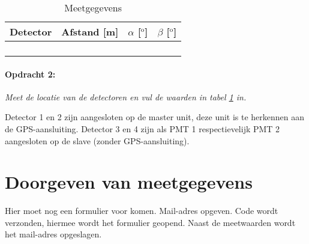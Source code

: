 \begin{table}[h]
    \centering
    \begin{tabular}{|>{\centering}p{3.5cm}|>{\centering}p{3.5cm}|>{\centering}p{3.5cm}|>{\centering}p{3.5cm}|}
        \hline 
        Detector & Afstand {[}m{]} & $\alpha$ {[}$^{\mathrm{o}}${]} & $\beta$ {[}$^{\mathrm{o}}${]}\tabularnewline
        \hline 
        \hline 
        1 &  &  & \tabularnewline
        \hline 
        2 &  &  & \tabularnewline
        \hline 
        3 &  &  & \tabularnewline
        \hline 
        4 &  &  & \tabularnewline
        \hline 
    \end{tabular}

\caption{\label{tab:Meetgegevens}Meetgegevens}
\end{table}

\paragraph{Opdracht 2:}

\textit{Meet de locatie van de detectoren en vul de waarden in tabel
\ref{tab:Meetgegevens} in.}

Detector 1 en 2 zijn aangesloten op de \hisparc master unit, deze unit is
te herkennen aan de GPS-aansluiting. Detector 3 en 4 zijn als PMT 1
respectievelijk PMT 2 aangesloten op de \hisparc slave (zonder
GPS-aansluiting).


\section{Doorgeven van meetgegevens}

Hier moet nog een formulier voor komen. Mail-adres opgeven. Code wordt
verzonden, hiermee wordt het formulier geopend. Naast de meetwaarden
wordt het mail-adres opgeslagen.


